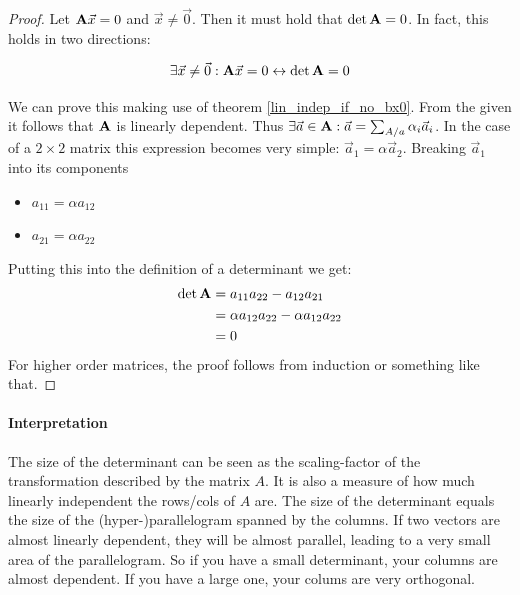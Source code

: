 \begin{proof} \label{det_0}
    Let $ \mathbf{A} \vec{x} = 0 $ and $ \vec{x} \neq \vec{0}$. Then it must hold that $\det{\ensuremath{\mathbf{A}}} = 0$.
    In fact, this holds in two directions:

    $$ \exists \vec{x} \neq \vec{0}: \mathbf{A} \vec{x} = 0  \leftrightarrow \det{\ensuremath{\mathbf{A}}} = 0 $$

    We can prove this making use of theorem \ref{lin_indep_if_no_bx0}. From the given it follows that $\mathbf{A}$ is linearly dependent. 
    Thus $\exists \vec{a} \in \mathbf{A}: \vec{a} = \sum_{A/a} \alpha_i \vec{a}_i$. In the case of a $2 \times 2$ matrix this expression becomes very simple: $\vec{a}_1 = \alpha \vec{a}_2$. 
    Breaking $\vec{a}_1$ into its components
    \begin{itemize}
        \item $a_{11} = \alpha a_{12}$
        \item $a_{21} = \alpha a_{22}$
    \end{itemize}
    Putting this into the definition of a determinant we get:
    \begin{equation}
        \begin{aligned}
            \det{\ensuremath{\mathbf{A}}}  &= a_{11}a_{22} - a_{12}a_{21} \\
                            &= \alpha a_{12} a_{22} - \alpha a_{12} a_{22} \\
                            &= 0
        \end{aligned}
    \end{equation}
    For higher order matrices, the proof follows from induction or something like that.
\end{proof}



\paragraph{Interpretation} The size of the determinant can be seen as the scaling-factor of the transformation described by the matrix $A$.
It is also a measure of how much linearly independent the rows/cols of $A$ are. The size of the determinant equals the size of the (hyper-)parallelogram spanned by the columns. If two vectors are almost linearly dependent, they will be almost parallel, leading to a very small area of the parallelogram. So if you have a small determinant, your columns are almost dependent. If you have a large one, your colums are very orthogonal. 












